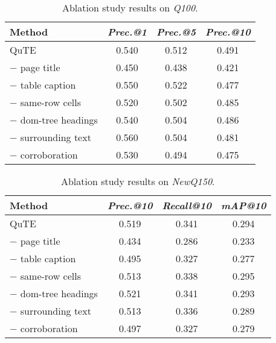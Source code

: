 \begin{table}[t]

  \caption{Ablation study results on \textit{Q100}.}
	\vspace{\tsq}
  \centering
  \begin{tabular}{l|ccc} \hline
Method & \textit{Prec.@1} & \textit{Prec.@5} & \textit{Prec.@10} \\  \hline
    {QuTE} & 0.540 & 0.512 & 0.491  \\ 
    \hline
    {\hspace{0.25em}$-$ page title} &  0.450 & 0.438 & 0.421   \\  
    {\hspace{0.25em}$-$ table caption} &  0.550 & 0.522 & 0.477  \\  
    {\hspace{0.25em}$-$ same-row cells} &  0.520 & 0.502 & 0.485  \\  
    {\hspace{0.25em}$-$ dom-tree headings} &  0.540 & 0.504 & 0.486   \\ 
    {\hspace{0.25em}$-$ surrounding text} &  0.560 & 0.504 & 0.481 \\ 
    \hline
    {\hspace{0.25em}$-$ corroboration} & 0.530 & 0.494 & 0.475 \\ 
    \hline
  \end{tabular}
    \label{table:ablation_study_q100}


\end{table}
\begin{table}[t]
  
  \caption{Ablation study results on \textit{NewQ150}.}
	\vspace{\tsq}
  \centering
  \begin{tabular}{l|ccc} \hline
Method & \textit{Prec.@10} & \textit{Recall@10} & \textit{mAP@10} \\  \hline
    {QuTE} & 0.519 & 0.341 & 0.294  \\  
    \hline
    {\hspace{0.25em}$-$ page title} & 0.434 & 0.286 & 0.233  \\
    {\hspace{0.25em}$-$ table caption} & 0.495 & 0.327 & 0.277  \\  
    {\hspace{0.25em}$-$ same-row cells} & 0.513 & 0.338 & 0.295 \\  
    {\hspace{0.25em}$-$ dom-tree headings} &  0.521 & 0.341 & 0.293   \\  
    {\hspace{0.25em}$-$ surrounding text} & 0.513 & 0.336 & 0.289  \\ 
    \hline
    {\hspace{0.25em}$-$ corroboration} & 0.497 & 0.327 & 0.279 \\ 
    \hline
  \end{tabular}
  \label{table:ablation_study_q150}
\end{table}